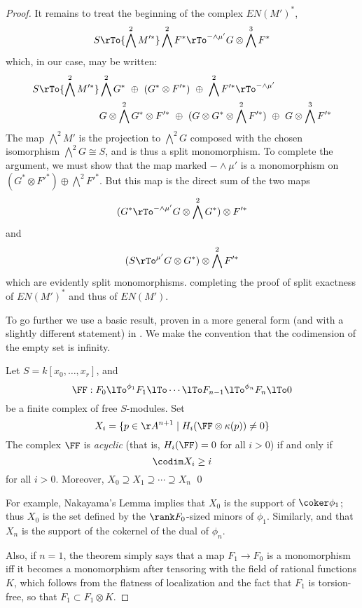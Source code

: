 \begin{proof}
It remains to treat the beginning of the complex $EN(M')^*$,
$$
S \rTo{\bigwedge^2 M'^*} 
 \bigwedge^2 F^*
 \rTo^{-\wedge \mu'}
G\otimes \bigwedge^3 F^*
$$
which, in our case, may be written:
\begin{align*}
S \rTo{\bigwedge^2 M'^*} 
 &\bigwedge^2 G^* \ \oplus\ (G^*\otimes F'^*)\ \oplus\ \bigwedge^2 F'^*
 \rTo^{-\wedge \mu'} \\
 &G\otimes \bigwedge^2 G^*\otimes F'^*\ \oplus\ (G\otimes G^*\otimes \bigwedge^2 F'^*)\ \oplus\ G\otimes \bigwedge^3 F'^*
\end{align*}
The map $\bigwedge^2 M'$ is the projection to $\bigwedge^2 G$ composed with the chosen isomorphism
$\bigwedge^2 G \cong S$, and is thus a split monomorphism. To complete the argument, we must show that
 the map marked $-\wedge \mu'$ is a monomorphism on $(G^*\otimes F'^*) \oplus \bigwedge^2 F'^*$.
 But this map is the direct sum of the two maps
  $$
 (G^* \rTo^{-\wedge \mu'} G\otimes \bigwedge^2 G^*)  \otimes F'^*
 $$
 and
 $$
(S  \rTo^{\mu'} G\otimes G^*) \otimes \bigwedge^2 F'^*
 $$
 which are evidently split monomorphisms. 
completing the proof of split exactness of $EN(M')^*$ and thus of $EN(M')$.


To go further we use a basic result, proven in a more general form (and with a slightly different statement) in \cite[Theorem ***]{WMACE}. We make the convention
that the codimension of the empty set is infinity.

\begin{theorem}\label{WMACE}
 Let $S = k[x_0,\dots, x_r]$, and
 $$ 
\FF:  F_0\lTo^{\phi_1}F_1 \lTo \cdots \lTo F_{n-1}\lTo^{\phi_n} F_n\lTo 0
 $$
be a finite complex of free $S$-modules. Set
$$
X_i = \{p\in \AA^{n+1} \mid  H_i(\FF \otimes \kappa(p)) \neq 0\}
$$
The complex $\FF$ is \emph{acyclic} (that is, $H_i(\FF) = 0$ for all $i>0$) if and only if
$$
\codim X_i \geq i
$$
for all $i>0$. Moreover, $X_{0}\supseteq X_{1}\supseteq \cdots \supseteq X_{n}$
\qed
\end{theorem}

For example, Nakayama's Lemma implies that $X_{0}$ is the support of $\coker \phi_{1}$; thus $X_{0}$ is the set defined by the $\rank F_{0}$-sized minors of $\phi_{1}$. Similarly, 
and that $X_{n}$ is the support of the cokernel of the dual of $\phi_{n}$. 

Also, if $n=1$, the theorem simply says that a map $F_1\to F_0$ is a monomorphism iff it becomes a monomorphism after tensoring with the field of rational functions $K$, which follows from the flatness of
localization and the fact that $F_1$ is torsion-free, so that
$F_1 \subset F_1 \otimes K$. 


\end{proof}
